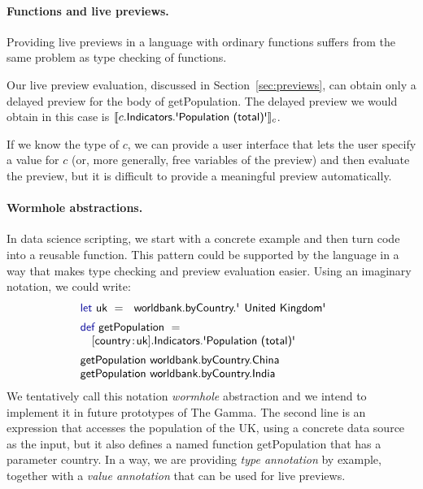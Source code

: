 \documentclass[sigplan,10pt]{acmart}\settopmatter{printfolios=true,printccs=false,printacmref=false}
\theoremstyle{plain}
\theoremstyle{definition}
\newcommand{\ident}[1]{\textnormal{\sffamily #1}}
\newcommand{\kvd}[1]{\textnormal{\textcolor{kvdclr}{\sffamily #1}}}
\begin{document}
\paragraph{Functions and live previews.} 
Providing live previews in a language with ordinary functions suffers from the same problem as 
type checking of functions.

Our live preview evaluation, discussed in Section~\ref{sec:previews}, can obtain only a delayed 
preview for the body of \ident{getPopulation}. The delayed preview we would obtain in this case
is $\llbracket c.\ident{Indicators}.\ident{\textquotesingle Population (total)\textquotesingle} \rrbracket_{c}$.

If we know the type of $c$, we can provide a user interface that lets the user specify a value 
for $c$ (or, more generally, free variables of the preview) and then evaluate the preview, but 
it is difficult to provide a meaningful preview automatically.

\paragraph{Wormhole abstractions.}
In data science scripting, we start with a concrete example and then turn code into a reusable
function. This pattern could be supported by the language in a way that makes type checking
and preview evaluation easier. Using an imaginary notation, we could write:
%
\begin{equation*}
\begin{array}{l}
\kvd{let}~\ident{uk}~=~\ident{worldbank.byCountry.\textquotesingle United Kingdom\textquotesingle}\hspace{1.5em}\\[0.5em]
\kvd{def}~\ident{getPopulation}~=\\
\quad\lbrack\ident{country}\!:\!\ident{uk}\rbrack.\ident{Indicators.\textquotesingle Population (total)\textquotesingle}\\[0.5em]
\ident{getPopulation}~\ident{worldbank.byCountry.China}\\
\ident{getPopulation}~\ident{worldbank.byCountry.India}
\end{array}
\end{equation*}
%
We tentatively call this notation \emph{wormhole} abstraction and we intend to implement it in future prototypes of The Gamma.
The second line is an expression that accesses the population of the UK, using a concrete
data source as the input, but it also defines a named function \ident{getPopulation} that has a
parameter \ident{country}. In a way, we are providing \emph{type annotation} by example, together
with a \emph{value annotation} that can be used for live previews.
\end{document}
